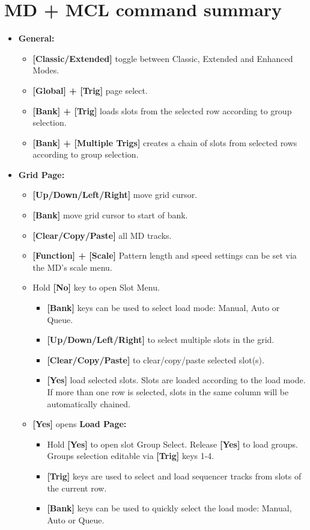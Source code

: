 \section{MD + MCL command summary}
\begin{itemize}
\item \textbf{General:}
   \begin{itemize}
      \item \textbf{[Classic/Extended] } toggle between Classic, Extended and Enhanced Modes.
      \item \textbf{[Global] + [Trig] } page select.
      \item \textbf{[Bank] + [Trig]} loads slots from the selected row according to group selection.
      \item \textbf{[Bank] + [Multiple Trigs]} creates a chain of slots from selected rows according to group selection.
   \end{itemize}

\item \textbf{Grid Page:}
    \begin{itemize}
      \item \textbf{[Up/Down/Left/Right]} move grid cursor.
      \item \textbf{[Bank]} move grid cursor to start of bank.
      \item \textbf{[Clear/Copy/Paste]} all MD tracks.
      \item \textbf{[Function] + [Scale]} Pattern length and speed settings can be set via the MD's scale menu.
      \item Hold \textbf{[No]} key to open Slot Menu.
      \begin{itemize}
                \item \textbf{[Bank]} keys can be used to select load mode: Manual, Auto or Queue.
                \item \textbf{[Up/Down/Left/Right]} to select multiple slots in the grid.
                \item \textbf{[Clear/Copy/Paste]} to clear/copy/paste selected slot(s).
                \item \textbf{[Yes]} load selected slots. Slots are loaded according to the load mode. If more than one row is selected, slots in the same column will be automatically chained.
      \end{itemize}

\item \textbf{[Yes]} opens \textbf{Load Page:}
    \begin{itemize}
    \item Hold \textbf{[Yes]} to open slot Group Select. Release \textbf{[Yes]} to load groups. Groups selection editable via \textbf{[Trig]} keys 1-4.
    \item \textbf{[Trig]} keys are used to select and load sequencer tracks from slots of the current row.
    \item \textbf{[Bank]} keys can be used to quickly select the load mode: Manual, Auto or Queue.
    \end{itemize}
    

\end{itemize}
\end{itemize}
